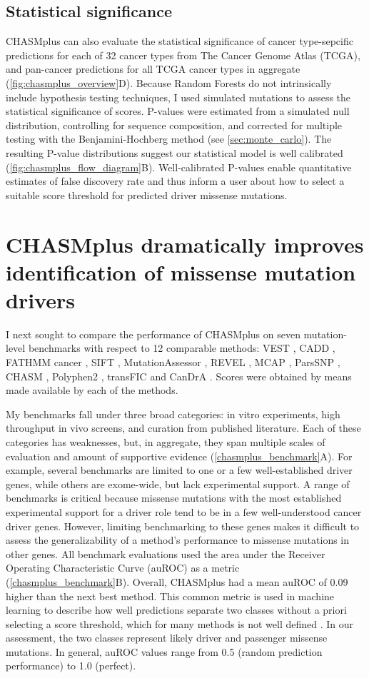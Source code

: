 \subsection{Statistical significance}
CHASMplus can also evaluate the statistical significance of cancer type-sepcific predictions for each of 32 cancer types from The Cancer Genome Atlas (TCGA), and pan-cancer predictions for all TCGA cancer types in aggregate (\autoref{fig:chasmplus_overview}D). Because Random Forests do not intrinsically include hypothesis testing techniques, I used simulated mutations to assess the statistical significance of scores. P-values were estimated from a simulated null distribution, controlling for sequence composition, and corrected for multiple testing with the Benjamini-Hochberg method (see \autoref{sec:monte_carlo}). The resulting P-value distributions suggest our statistical model is well calibrated (\autoref{fig:chasmplus_flow_diagram}B).  Well-calibrated P-values enable quantitative estimates of false discovery rate and thus inform a user about how to select a suitable score threshold for predicted driver missense mutations.

\section{CHASMplus dramatically improves identification of  missense mutation drivers}
I next sought to compare the performance of CHASMplus on seven mutation-level benchmarks with respect to 12 comparable methods: VEST \cite{RN30}, CADD \cite{RN34}, FATHMM cancer \cite{RN39}, SIFT \cite{RN116}, MutationAssessor \cite{RN38}, REVEL \cite{RN32}, MCAP \cite{RN33}, ParsSNP \cite{RN35}, CHASM \cite{RN29}, Polyphen2 \cite{RN28}, transFIC \cite{RN31} and CanDrA \cite{RN36}. Scores were obtained by means made available by each of the methods. 

My benchmarks fall under three broad categories: in vitro experiments, high throughput in vivo screens, and curation from published literature.  Each of these categories has weaknesses, but, in aggregate, they span multiple scales of evaluation and amount of supportive evidence (\autoref{chasmplus_benchmark}A). For example, several benchmarks are limited to one or a few well-established driver genes, while others are exome-wide, but lack experimental support. A range of benchmarks is critical because missense mutations with the most established experimental support for a driver role tend to be in a few well-understood cancer driver genes.  However, limiting benchmarking to these genes makes it difficult to assess the generalizability of a method's performance to missense mutations in other genes. All benchmark evaluations used the area under the Receiver Operating Characteristic Curve (auROC) as a metric (\autoref{chasmplus_benchmark}B).  Overall, CHASMplus had a mean auROC of 0.09 higher than the next best method. This common metric is used in machine learning to describe how well predictions separate two classes without a priori selecting a score threshold, which for many methods is not well defined \cite{RN140}. In our assessment, the two classes represent likely driver and passenger missense mutations. In general, auROC values range from 0.5 (random prediction performance) to 1.0 (perfect).

